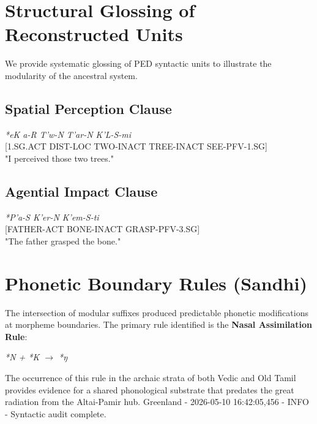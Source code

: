 \section{Structural Glossing of Reconstructed Units}
We provide systematic glossing of PED syntactic units to illustrate the modularity of the ancestral system.

\subsection{Spatial Perception Clause}
\begin{center}
\textit{*eK a-R T'w-N T'ar-N K'L-S-mi} \\
\small [1.SG.ACT DIST-LOC TWO-INACT TREE-INACT SEE-PFV-1.SG] \\
\normalsize "I perceived those two trees."
\end{center}

\subsection{Agential Impact Clause}
\begin{center}
\textit{*P'a-S K'er-N K'em-S-ti} \\
\small [FATHER-ACT BONE-INACT GRASP-PFV-3.SG] \\
\normalsize "The father grasped the bone."
\end{center}

\section{Phonetic Boundary Rules (Sandhi)}
The intersection of modular suffixes produced predictable phonetic modifications at morpheme boundaries. The primary rule identified is the \textbf{Nasal Assimilation Rule}:
\begin{center}
\textit{*N + *K $\rightarrow$ *ŋ}
\end{center}
The occurrence of this rule in the archaic strata of both Vedic and Old Tamil provides evidence for a shared phonological substrate that predates the great radiation from the Altai-Pamir hub.
 Greenland
    - 2026-05-10 16:42:05,456 - INFO - Syntactic audit complete.
